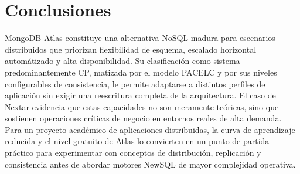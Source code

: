 \documentclass[10pt,journal]{IEEEtran}
\begin{document}
\section{Conclusiones}
MongoDB Atlas constituye una alternativa NoSQL madura para escenarios distribuidos que priorizan flexibilidad de esquema, escalado horizontal autom\'atizado y alta disponibilidad. Su clasificaci\'on como sistema predominantemente CP, matizada por el modelo PACELC y por sus niveles configurables de consistencia, le permite adaptarse a distintos perfiles de aplicaci\'on sin exigir una reescritura completa de la arquitectura. El caso de Nextar evidencia que estas capacidades no son meramente te\'oricas, sino que sostienen operaciones cr\'iticas de negocio en entornos reales de alta demanda. Para un proyecto acad\'emico de aplicaciones distribuidas, la curva de aprendizaje reducida y el nivel gratuito de Atlas lo convierten en un punto de partida pr\'actico para experimentar con conceptos de distribuci\'on, replicaci\'on y consistencia antes de abordar motores NewSQL de mayor complejidad operativa.
\end{document}
